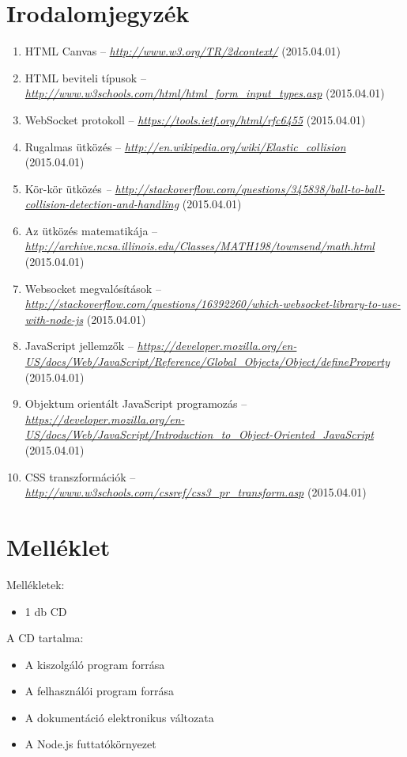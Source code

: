 \documentclass[]{article}
\begin{document}
\section{Irodalomjegyzék}

\begin{enumerate}
\def\labelenumi{\arabic{enumi}.}
\item
  HTML Canvas --
  \href{http://www.w3.org/TR/2dcontext/}{\emph{http://www.w3.org/TR/2dcontext/}}
  (2015.04.01)
\item
  HTML beviteli típusok --
  \href{http://www.w3schools.com/html/html_form_input_types.asp}{\emph{http://www.w3schools.com/html/html\_form\_input\_types.asp}}
  (2015.04.01)
\item
  WebSocket protokoll --
  \href{https://tools.ietf.org/html/rfc6455}{\emph{https://tools.ietf.org/html/rfc6455}}
  (2015.04.01)
\item
  Rugalmas ütközés --
  \href{http://en.wikipedia.org/wiki/Elastic_collision}{\emph{http://en.wikipedia.org/wiki/Elastic\_collision}}
  (2015.04.01)
\item
  Kör-kör ütközés \emph{--
  \href{http://stackoverflow.com/questions/345838/ball-to-ball-\%20collision-detection-and-handling}{http://stackoverflow.com/questions/345838/ball-to-ball-
  collision-detection-and-handling}} (2015.04.01)
\item
  Az ütközés matematikája --
  \emph{\url{http://archive.ncsa.illinois.edu/Classes/MATH198/townsend/math.html}}
  (2015.04.01)
\item
  Websocket megvalósítások --
  \href{http://stackoverflow.com/questions/16392260/which-websocket-library-to-use-with-node-js}{\emph{http://stackoverflow.com/questions/16392260/which-websocket-library-to-use-with-node-js}}
  (2015.04.01)
\item
  JavaScript jellemzők --
  \href{https://developer.mozilla.org/en-US/docs/Web/JavaScript/Reference/Global_Objects/Object/defineProperty}{\emph{https://developer.mozilla.org/en-US/docs/Web/JavaScript/Reference/Global\_Objects/Object/defineProperty}}
  (2015.04.01)
\item
  Objektum orientált JavaScript programozás --
  \emph{\url{https://developer.mozilla.org/en-US/docs/Web/JavaScript/Introduction_to_Object-Oriented_JavaScript}}
  (2015.04.01)
\item
  CSS transzformációk --
  \emph{\url{http://www.w3schools.com/cssref/css3_pr_transform.asp}}
  (2015.04.01)
\end{enumerate}


\section{Melléklet}

Mellékletek:

\begin{itemize}
\item
  1 db CD
\end{itemize}

A CD tartalma:

\begin{itemize}
\item
  A kiszolgáló program forrása
\item
  A felhasználói program forrása
\item
  A dokumentáció elektronikus változata
\item
  A Node.js futtatókörnyezet
\end{itemize}
\end{document}

